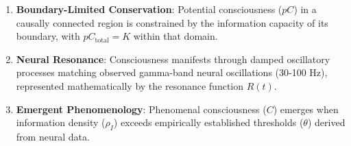 \documentclass[12pt]{article}
\begin{document}
\begin{enumerate}
    \item \textbf{Boundary-Limited Conservation}: Potential consciousness ($pC$) in a causally connected region is constrained by the information capacity of its boundary, with $pC_{\text{total}} = K$ within that domain.
    
    \item \textbf{Neural Resonance}: Consciousness manifests through damped oscillatory processes matching observed gamma-band neural oscillations (30-100 Hz), represented mathematically by the resonance function $R(t)$.
    
    \item \textbf{Emergent Phenomenology}: Phenomenal consciousness ($C$) emerges when information density ($\rho_I$) exceeds empirically established thresholds ($\theta$) derived from neural data.
\end{enumerate}
\end{document}
